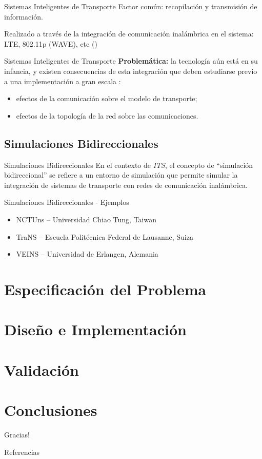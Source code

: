 \documentclass[aspectratio=169]{beamer}
\begin{document}
\begin{frame}{Sistemas Inteligentes de Transporte}
Factor común: recopilación y transmisión de información.

Realizado a través de la integración de comunicación inalámbrica en el sistema: LTE, 802.11p (WAVE), etc (\autocite{80211dailey,80211wave,80215vanet,dar2010wireless})
\end{frame}

\begin{frame}{Sistemas Inteligentes de Transporte}
\textbf{Problemática:} la tecnología aún está en su infancia, y existen consecuencias de esta integración que deben estudiarse previo a una implementación a gran escala \autocite{sommer2008need}:
\begin{itemize}
    \item efectos de la comunicación sobre el modelo de transporte;
    \item efectos de la topología de la red sobre las comunicaciones.
\end{itemize}
\end{frame}

\subsection{Simulaciones Bidireccionales}

\begin{frame}{Simulaciones Bidireccionales}
En el contexto de \emph{ITS}, el concepto de ``simulación bidireccional'' se refiere a un entorno de simulación que permite simular la integración de sistemas de transporte con redes de comunicación inalámbrica.
\end{frame}

\begin{frame}{Simulaciones Bidireccionales - Ejemplos}
\begin{itemize}
    \item NCTUns -- Universidad Chiao Tung, Taiwan \autocite{nctuns6}
    \item TraNS -- Escuela Politécnica Federal de Lausanne, Suiza \autocite{piorkowski2008trans}
    \item VEINS -- Universidad de Erlangen, Alemania \autocite{sommer_german_dressler}
\end{itemize}
\end{frame}


    
\section{Especificación del Problema}
\section{Diseño e Implementación}
\section{Validación}
\section{Conclusiones}
\begin{frame}[standout]
Gracias!
\end{frame}

\begin{frame}[c,allowframebreaks]{Referencias}
\printbibliography[heading=none]
\end{frame}
\end{document}
